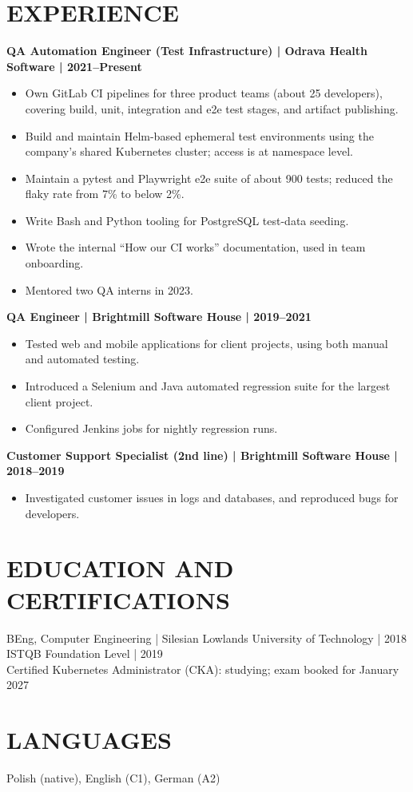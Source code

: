 \documentclass[11pt,a4paper]{article}
\begin{document}
\section*{EXPERIENCE}
\textbf{QA Automation Engineer (Test Infrastructure) | Odrava Health Software | 2021–Present}
\begin{itemize}
\item Own GitLab CI pipelines for three product teams (about 25 developers), covering build, unit, integration and e2e test stages, and artifact publishing.
\item Build and maintain Helm-based ephemeral test environments using the company’s shared Kubernetes cluster; access is at namespace level.
\item Maintain a pytest and Playwright e2e suite of about 900 tests; reduced the flaky rate from 7\% to below 2\%.
\item Write Bash and Python tooling for PostgreSQL test-data seeding.
\item Wrote the internal “How our CI works” documentation, used in team onboarding.
\item Mentored two QA interns in 2023.
\end{itemize}
\textbf{QA Engineer | Brightmill Software House | 2019–2021}
\begin{itemize}
\item Tested web and mobile applications for client projects, using both manual and automated testing.
\item Introduced a Selenium and Java automated regression suite for the largest client project.
\item Configured Jenkins jobs for nightly regression runs.
\end{itemize}
\textbf{Customer Support Specialist (2nd line) | Brightmill Software House | 2018–2019}
\begin{itemize}
\item Investigated customer issues in logs and databases, and reproduced bugs for developers.
\end{itemize}
\section*{EDUCATION AND CERTIFICATIONS}
BEng, Computer Engineering | Silesian Lowlands University of Technology | 2018\\
ISTQB Foundation Level | 2019\\
Certified Kubernetes Administrator (CKA): studying; exam booked for January 2027
\section*{LANGUAGES}
Polish (native), English (C1), German (A2)
\end{document}

